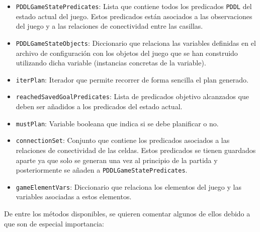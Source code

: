 \begin{itemize}[label=\textbullet]
    \item \texttt{PDDLGameStatePredicates}: Lista que contiene todos los predicados \texttt{PDDL} del estado
    actual del juego. Estos predicados están asociados a las observaciones del juego y a las relaciones
    de conectividad entre las casillas.
    
    \item \texttt{PDDLGameStateObjects}: Diccionario que relaciona las variables definidas en el archivo
    de configuración con los objetos del juego que se han construido utilizando dicha variable (instancias
    concretas de la variable).
    
    \item \texttt{iterPlan}: Iterador que permite recorrer de forma sencilla el plan generado.
    
    \item \texttt{reachedSavedGoalPredicates}: Lista de predicados objetivo alcanzados que deben
    ser añadidos a los predicados del estado actual.
    
    \item \texttt{mustPlan}: Variable booleana que indica si se debe planificar o no.
    
    \item \texttt{connectionSet}: Conjunto que contiene los predicados asociados a las relaciones
    de conectividad de las celdas. Estos predicados se tienen guardados aparte ya que solo se
    generan una vez al principio de la partida y posteriormente se añaden a \texttt{PDDLGameStatePredicates}.
    
    \item \texttt{gameElementVars}: Diccionario que relaciona los elementos del juego y las
    variables asociadas a estos elementos.
\end{itemize}

De entre los métodos disponibles, se quieren comentar algunos de ellos debido a que
son de especial importancia:

